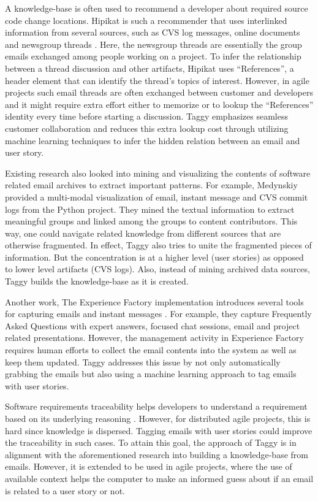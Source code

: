 A knowledge-base is often used to recommend a developer about required source code change locations. Hipikat is such a recommender that uses interlinked information from several sources, such as CVS log messages, online documents and newsgroup threads \cite{hipikat}. Here, the newsgroup threads are essentially the group emails exchanged among people working on a project. To infer the relationship between a thread discussion and other artifacts, Hipikat uses ``References'', a header element that can identify the thread's topics of interest. However, in agile projects such email threads are often exchanged between customer and developers and it might require extra effort either to memorize or to lookup the ``References'' identity every time before starting a discussion. Taggy emphasizes seamless customer collaboration and reduces this extra lookup cost through utilizing machine learning techniques to infer the hidden relation between an email and user story.

Existing research also looked into mining and visualizing the contents of software related email archives to extract important patterns. For example, Medynskiy provided a multi-modal visualization of email, instant message and CVS commit logs from the Python project\cite{using_hybrid}. They mined the textual information to extract meaningful groups and linked among the groups to content contributors. This way, one could navigate related knowledge from different sources that are otherwise fragmented. In effect, Taggy also tries to unite the fragmented pieces of information. But the concentration is at a higher level (user stories) as opposed to lower level artifacts (CVS logs). Also, instead of mining archived data sources, Taggy builds the knowledge-base as it is created.

Another work, The Experience Factory implementation introduces several tools for capturing emails and instant messages \cite{implementing_an_experience}. For example, they capture Frequently Asked Questions with expert answers, focused chat sessions, email and project related presentations. However, the management activity in Experience Factory requires human efforts to collect the email contents into the system as well as keep them updated. Taggy addresses this issue by not only automatically grabbing the emails but also using a machine learning approach to tag emails with user stories.

Software requirements traceability helps developers to understand a requirement based on its underlying reasoning \cite{automating_requirements}. However, for distributed agile projects, this is hard since knowledge is dispersed. Tagging emails with user stories could improve the traceability in such cases. To attain this goal, the approach of Taggy is in alignment with the aforementioned research into building a knowledge-base from emails. However, it is extended to be used in agile projects, where the use of available context helps the computer to make an informed guess about if an email is related to a user story or not.

